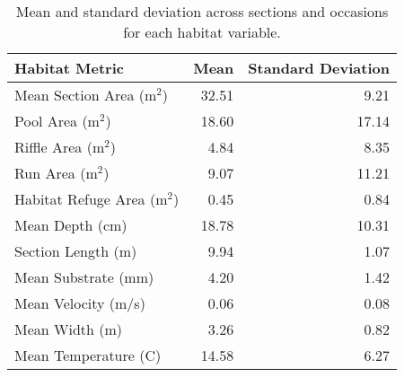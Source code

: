 \begin{table}[ht]
\centering
\caption{Mean and standard deviation across sections and occasions for each habitat variable.} 
\label{tab:habitat}
\begin{tabular}{lrr}
  \hline
Habitat Metric & Mean & Standard Deviation \\ 
  \hline
Mean Section Area (m$^2$) & 32.51 & 9.21 \\ 
  Pool Area (m$^2$) & 18.60 & 17.14 \\ 
  Riffle Area (m$^2$) & 4.84 & 8.35 \\ 
  Run Area (m$^2$) & 9.07 & 11.21 \\ 
  Habitat Refuge Area (m$^2$) & 0.45 & 0.84 \\ 
  Mean Depth (cm) & 18.78 & 10.31 \\ 
  Section Length (m) & 9.94 & 1.07 \\ 
  Mean Substrate (mm) & 4.20 & 1.42 \\ 
  Mean Velocity (m/s) & 0.06 & 0.08 \\ 
  Mean Width (m) & 3.26 & 0.82 \\ 
  Mean Temperature (C) & 14.58 & 6.27 \\ 
   \hline
\end{tabular}
\end{table}
